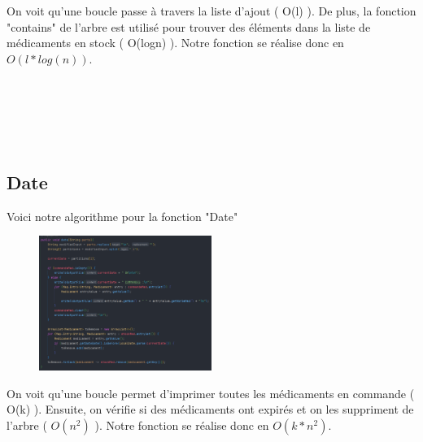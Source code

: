 \documentclass{article}
\begin{document}
On voit qu'une boucle passe à travers la liste d'ajout ( O(l) ). De plus, la fonction "contains" de l'arbre est utilisé pour trouver des éléments dans la liste de médicaments en stock ( O(logn) ). Notre fonction se réalise donc en $O(l*log(n))$. \\\\\\\\\\\\

\subsection{Date}

Voici notre algorithme pour la fonction "Date"

\begin{figure}[htp]
\centering
\includegraphics[width=0.5\textwidth]{Date.png}
\end{figure}

On voit qu'une boucle permet d'imprimer toutes les médicaments en commande ( O(k) ). Ensuite, on vérifie si des médicaments ont expirés et on les suppriment de l'arbre ( $O(n^2)$ ). Notre fonction se réalise donc en $O(k*n^2)$. 
\end{document}
